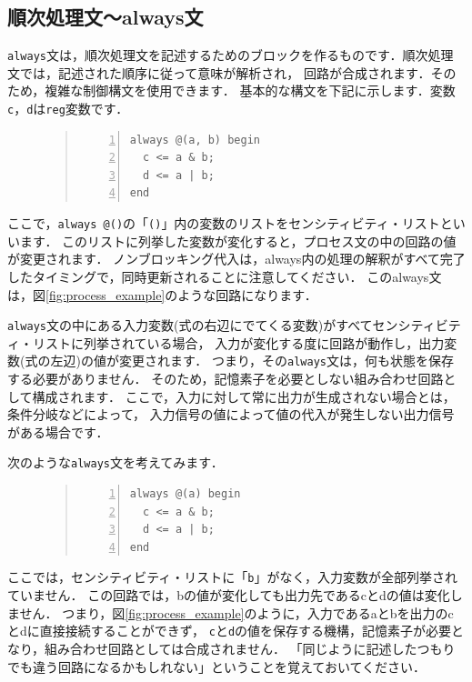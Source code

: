 \documentclass[a4paper,dvipdfmx]{jsarticle}
\begin{document}
\subsection{順次処理文〜always文}
\verb|always|文は，順次処理文を記述するためのブロックを作るものです．順次処理文では，記述された順序に従って意味が解析され，
回路が合成されます．そのため，複雑な制御構文を使用できます．
基本的な構文を下記に示します．変数\verb|c|，\verb|d|は\verb|reg|変数です．
\begin{figure}[H]
\begin{quote}
\begin{Verbatim}[frame=single, numbers=left, baselinestretch=0.8]
always @(a, b) begin
  c <= a & b;
  d <= a | b;
end
\end{Verbatim}
\end{quote}
\end{figure}

ここで，\verb|always @()|の「\verb|()|」内の変数のリストをセンシティビティ・リストといいます．
このリストに列挙した変数が変化すると，プロセス文の中の回路の値が変更されます．
ノンブロッキング代入は，always内の処理の解釈がすべて完了したタイミングで，同時更新されることに注意してください．
このalways文は，図\ref{fig:process_example}のような回路になります．

\verb|always|文の中にある入力変数(式の右辺にでてくる変数)がすべてセンシティビティ・リストに列挙されている場合，
入力が変化する度に回路が動作し，出力変数(式の左辺)の値が変更されます．
つまり，その\verb|always|文は，何も状態を保存する必要がありません．
そのため，記憶素子を必要としない組み合わせ回路として構成されます．
ここで，入力に対して常に出力が生成されない場合とは，条件分岐などによって，
入力信号の値によって値の代入が発生しない出力信号がある場合です．

次のような\verb|always|文を考えてみます．
\begin{figure}[H]
\begin{quote}
\begin{Verbatim}[frame=single, numbers=left, baselinestretch=0.8]
always @(a) begin
  c <= a & b;
  d <= a | b;
end
\end{Verbatim}
\end{quote}
\end{figure}
ここでは，センシティビティ・リストに「\verb|b|」がなく，入力変数が全部列挙されていません．
この回路では，bの値が変化しても出力先であるcとdの値は変化しません．
つまり，図\ref{fig:process_example}のように，入力であるaとbを出力のcとdに直接接続することができず，
\verb|c|と\verb|d|の値を保存する機構，記憶素子が必要となり，組み合わせ回路としては合成されません．
「同じように記述したつもりでも違う回路になるかもしれない」ということを覚えておいてください．
\end{document}

